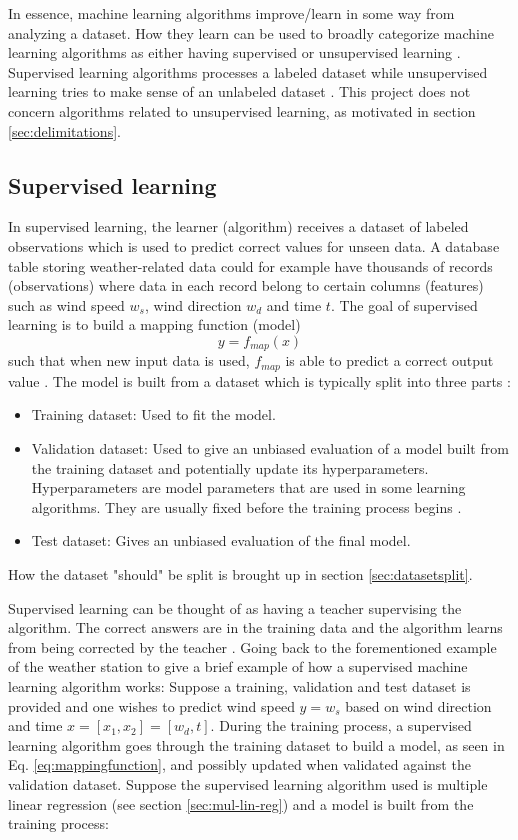 	In essence, machine learning algorithms improve/learn in some way from analyzing a dataset. How they learn can be used to broadly categorize machine learning algorithms as either having supervised or unsupervised learning \cite{BOOK:1}. Supervised learning algorithms processes a labeled dataset while unsupervised learning tries to make sense of an unlabeled dataset \cite{BOOK:3}. This project does not concern algorithms related to unsupervised learning, as motivated in section \ref{sec:delimitations}.


\subsection{Supervised learning} \label{sec:supervisedlearning}
	In supervised learning, the learner (algorithm) receives a dataset of labeled observations which is used to predict correct values for unseen data\cite{BOOK:3}. A database table storing weather-related data could for example have thousands of records (observations) where data in each record belong to certain columns (features) such as wind speed $w_s$, wind direction $w_d$ and time $t$. The goal of supervised learning is to build a mapping function (model)
\begin{equation} \label{eq:mappingfunction}
	y = f_{map}(x)
\end{equation}
such that when new input data is used, $f_{map}$ is able to predict a correct output value \cite{WEBSITE:3}. The model is built from a dataset which is typically split into three parts \cite{WEBSITE:4}:

\begin{itemize}
	\item {Training dataset:} Used to fit the model.
	\item {Validation dataset:} Used to give an unbiased evaluation of a model built from the training dataset and potentially update its hyperparameters. Hyperparameters are model parameters that are used in some learning algorithms. They are usually fixed before the training process begins \cite{WEBSITE:7}.
	\item {Test dataset:} Gives an unbiased evaluation of the final model.
\end{itemize}
	How the dataset "should" be split is brought up in section \ref{sec:datasetsplit}. 

	Supervised learning can be thought of as having a teacher supervising the algorithm. The correct answers are in the training data and the algorithm learns from being corrected by the teacher \cite{WEBSITE:3}. Going back to the forementioned example of the weather station to give a brief example of how a supervised machine learning algorithm works: Suppose a training, validation and test dataset is provided and one wishes to predict wind speed $y = w_s$ based on wind direction and time $x = [x_1, x_2] = [w_d, t]$. During the training process, a supervised learning algorithm goes through the training dataset to build a model, as seen in Eq. \ref{eq:mappingfunction}, and possibly updated when validated against the validation dataset. Suppose the supervised learning algorithm used is multiple linear regression (see section \ref{sec:mul-lin-reg}) and a model is built from the training process: 

